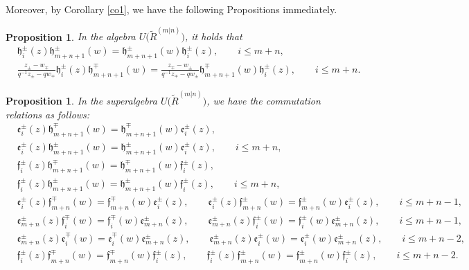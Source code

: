\documentclass[10pt,a4paper]{amsart}
\numberwithin{equation}{section}
\newtheorem{Proposition}[Theorem]{Proposition}
 { \theoremstyle{definition}
\newtheorem{Definition}[Theorem]{Definition}
\newtheorem{Note}[Theorem]{Note}
\newtheorem{Example}[Theorem]{Example}
\newtheorem{Remark}[Theorem]{Remark} }
\begin{document}
Moreover, by Corollary \ref{co1}, we have the following Propositions immediately.
\begin{Proposition}In the algebra $U\bigl(\widetilde{R}^{(m|n)}\bigr)$, it holds that
\begin{align*}
&\mathfrak{h}_i^{\pm}(z)\mathfrak{h}_{m+n+1}^{\pm}(w)=\mathfrak{h}_{m+n+1}^{\pm}(w)\mathfrak{h}_i^{\pm}(z),\qquad i\leq m+n,\\
&\frac{z_{\pm}-w_{\mp}}{q^{-1}z_{\pm}-qw_{\mp}}\mathfrak{h}_i^{\pm}(z)\mathfrak{h}_{m+n+1}^{\mp}(w)=\frac{z_{\mp}-w_{\pm}}{q^{-1}z_{\mp}-qw_{\pm}}\mathfrak{h}_{m+n+1}^{\mp}(w)\mathfrak{h}_i^{\pm}(z),\qquad i\leq m+n.
\end{align*}
\end{Proposition}
\begin{Proposition}In the superalgebra $U\bigl(\widetilde{R}^{(m|n)}\bigr)$, we have the commutation relations as follows:
\begin{align*}
&\mathfrak{e}_i^{\pm}(z)\mathfrak{h}_{m+n+1}^{\mp}(w)=\mathfrak{h}_{m+n+1}^{\mp}(w)\mathfrak{e}_i^{\pm}(z),\\ &\mathfrak{e}_i^{\pm}(z)\mathfrak{h}_{m+n+1}^{\pm}(w)=\mathfrak{h}_{m+n+1}^{\pm}(w)\mathfrak{e}_i^{\pm}(z),\qquad i\leq m+n,\\
&\mathfrak{f}_i^{\pm}(z)\mathfrak{h}_{m+n+1}^{\mp}(w)=\mathfrak{h}_{m+n+1}^{\mp}(w)\mathfrak{f}_i^{\pm}(z),\\ &\mathfrak{f}_i^{\pm}(z)\mathfrak{h}_{m+n+1}^{\pm}(w)=\mathfrak{h}_{m+n+1}^{\pm}(w)\mathfrak{f}_i^{\pm}(z),\qquad i\leq m+n,\\
&\mathfrak{e}_i^{\pm}(z)\mathfrak{f}_{m+n}^{\mp}(w)=\mathfrak{f}_{m+n}^{\mp}(w)\mathfrak{e}_i^{\pm}(z),\qquad \mathfrak{e}_i^{\pm}(z)\mathfrak{f}_{m+n}^{\pm}(w)=\mathfrak{f}_{m+n}^{\pm}(w)\mathfrak{e}_i^{\pm}(z),\qquad i\leq m+n-1,\\
&\mathfrak{e}_{m+n}^{\pm}(z)\mathfrak{f}_i^{\mp}(w)=\mathfrak{f}_i^{\mp}(w)\mathfrak{e}_{m+n}^{\pm}(z),\qquad \mathfrak{e}_{m+n}^{\pm}(z)\mathfrak{f}_i^{\pm}(w)=\mathfrak{f}_i^{\pm}(w)\mathfrak{e}_{m+n}^{\pm}(z), \qquad i\leq m+n-1,\\
&\mathfrak{e}_{m+n}^{\pm}(z)\mathfrak{e}_i^{\mp}(w)=\mathfrak{e}_i^{\mp}(w)\mathfrak{e}_{m+n}^{\pm}(z),\qquad \mathfrak{e}_{m+n}^{\pm}(z)\mathfrak{e}_i^{\pm}(w)=\mathfrak{e}_i^{\pm}(w)\mathfrak{e}_{m+n}^{\pm}(z), \qquad i\leq m+n-2,\\
&\mathfrak{f}_i^{\pm}(z)\mathfrak{f}_{m+n}^{\mp}(w)=\mathfrak{f}_{m+n}^{\mp}(w)\mathfrak{f}_i^{\pm}(z),\qquad \mathfrak{f}_i^{\pm}(z)\mathfrak{f}_{m+n}^{\pm}(w)=\mathfrak{f}_{m+n}^{\pm}(w)\mathfrak{f}_i^{\pm}(z),\qquad i\leq m+n-2.
\end{align*}
\end{Proposition}
\end{document}
